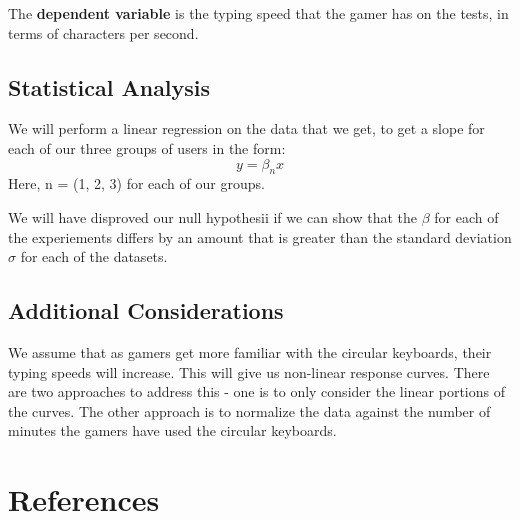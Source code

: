 \documentclass[
	letterpaper, %
]{jdf}
\begin{document}
The \textbf{dependent variable} is the typing speed that the gamer has on the tests, in terms of characters per second.

\subsection{Statistical Analysis}
We will perform a linear regression on the data that we get, to get a slope for each of our three groups of users in the form:
\begin{equation}
    y = \beta_n x
\end{equation}
Here, n = (1, 2, 3) for each of our groups.

We will have disproved our null hypothesii if we can show that the $\beta$ for each of the experiements differs by an amount that is greater than the standard deviation $\sigma$ for each of the datasets.

\subsection{Additional Considerations}
We assume that as gamers get more familiar with the circular keyboards, their typing speeds will increase. This will give us non-linear response curves. There are two approaches to address this - one is to only consider the linear portions of the curves. The other approach is to normalize the data against the number of minutes the gamers have used the circular keyboards.

\section{References}

\printbibliography[heading=none]
\end{document}
